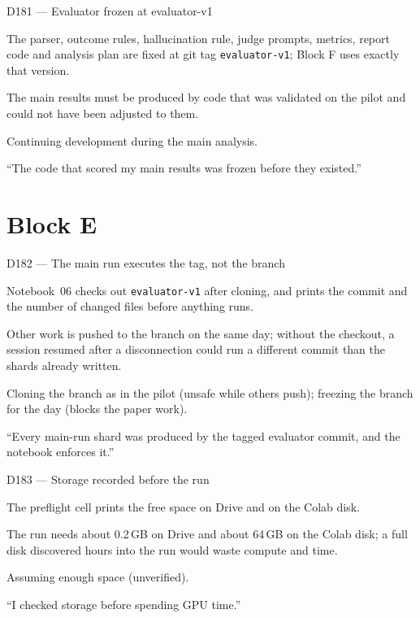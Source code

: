 \documentclass[11pt,a4paper]{report}
\begin{document}
\begin{decisionbox}{D181 --- Evaluator frozen at evaluator-v1}
\begin{description}[nosep, leftmargin=0pt]
  \item[Decision.] The parser, outcome rules, hallucination rule, judge prompts, metrics, report code and analysis plan are fixed at git tag \texttt{evaluator-v1}; Block F uses exactly that version.
  \item[Why.] The main results must be produced by code that was validated on the pilot and could not have been adjusted to them.
  \item[Alternatives.] Continuing development during the main analysis.
  \item[Interview line.] ``The code that scored my main results was frozen before they existed.''
\end{description}
\end{decisionbox}

\section{Block E}\label{sec:decisions-e}

\begin{decisionbox}{D182 --- The main run executes the tag, not the branch}
\begin{description}[nosep, leftmargin=0pt]
  \item[Decision.] Notebook~06 checks out \texttt{evaluator-v1} after cloning, and prints the commit and the number of changed files before anything runs.
  \item[Why.] Other work is pushed to the branch on the same day; without the checkout, a session resumed after a disconnection could run a different commit than the shards already written.
  \item[Alternatives.] Cloning the branch as in the pilot (unsafe while others push); freezing the branch for the day (blocks the paper work).
  \item[Interview line.] ``Every main-run shard was produced by the tagged evaluator commit, and the notebook enforces it.''
\end{description}
\end{decisionbox}

\begin{decisionbox}{D183 --- Storage recorded before the run}
\begin{description}[nosep, leftmargin=0pt]
  \item[Decision.] The preflight cell prints the free space on Drive and on the Colab disk.
  \item[Why.] The run needs about 0.2\,GB on Drive and about 64\,GB on the Colab disk; a full disk discovered hours into the run would waste compute and time.
  \item[Alternatives.] Assuming enough space (unverified).
  \item[Interview line.] ``I checked storage before spending GPU time.''
\end{description}
\end{decisionbox}
\end{document}
